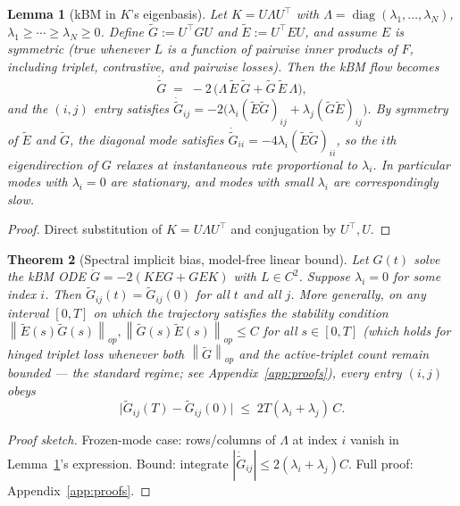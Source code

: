 \documentclass{article}
\newtheorem{theorem}{Theorem}
\newtheorem{lemma}[theorem]{Lemma}
\DeclareMathOperator{\diag}{diag}
\newcommand{\norm}[1]{\left\|#1\right\|}
\newcommand{\E}{E}
\newcommand{\Gtilde}{\widetilde{G}}
\newcommand{\Etilde}{\widetilde{\E}}
\begin{document}
\begin{lemma}[kBM in $K$'s eigenbasis]
\label{lem:eigen}
Let $K = U\Lambda U^\top$ with $\Lambda = \diag(\lambda_1, \ldots, \lambda_N)$,
$\lambda_1 \geq \cdots \geq \lambda_N \geq 0$. Define
$\Gtilde := U^\top G U$ and $\Etilde := U^\top \E U$, and assume $\E$ is
symmetric (true whenever $L$ is a function of pairwise inner products of
$F$, including triplet, contrastive, and pairwise losses). Then the kBM
flow becomes
\[
\dot{\Gtilde} \;=\; -2\,\bigl(\Lambda\,\Etilde\,\Gtilde + \Gtilde\,\Etilde\,\Lambda\bigr),
\]
and the $(i,j)$ entry satisfies
$\dot{\Gtilde}_{ij} = -2\bigl(\lambda_i (\Etilde\Gtilde)_{ij} +
\lambda_j (\Gtilde\Etilde)_{ij}\bigr)$. By symmetry of $\Etilde$ and
$\Gtilde$, the diagonal mode satisfies
$\dot{\Gtilde}_{ii} = -4\lambda_i (\Etilde\Gtilde)_{ii}$, so the
$i$th eigendirection of $G$ relaxes at instantaneous rate proportional to
$\lambda_i$. In particular modes with $\lambda_i = 0$ are stationary,
and modes with small $\lambda_i$ are correspondingly slow.
\end{lemma}

\begin{proof}
Direct substitution of $K = U\Lambda U^\top$ and conjugation by $U^\top, U$.
\end{proof}

\begin{theorem}[Spectral implicit bias, model-free linear bound]
\label{thm:spectral}
Let $G(t)$ solve the kBM ODE $\dot G = -2(K\E G + G \E K)$ with
$L \in C^2$. Suppose $\lambda_i = 0$ for some index $i$. Then
$\Gtilde_{ij}(t) = \Gtilde_{ij}(0)$ for all $t$ and all $j$. More
generally, on any interval $[0, T]$ on which the trajectory satisfies
the stability condition
$\norm{\Etilde(s)\Gtilde(s)}_{op}, \norm{\Gtilde(s)\Etilde(s)}_{op} \leq C$
for all $s \in [0, T]$ (which holds for hinged triplet loss whenever
both $\norm{\Gtilde}_{\!op}$ and the active-triplet count remain
bounded --- the standard regime; see Appendix~\ref{app:proofs}),
every entry $(i,j)$ obeys
\[
\bigl|\Gtilde_{ij}(T) - \Gtilde_{ij}(0)\bigr|
\;\leq\; 2T(\lambda_i + \lambda_j)\,C.
\]
\end{theorem}

\begin{proof}[Proof sketch]
Frozen-mode case: rows/columns of $\Lambda$ at index $i$ vanish in
Lemma~\ref{lem:eigen}'s expression. Bound: integrate
$|\dot{\Gtilde}_{ij}|\le 2(\lambda_i+\lambda_j)C$. Full proof:
Appendix~\ref{app:proofs}.
\end{proof}
\end{document}
